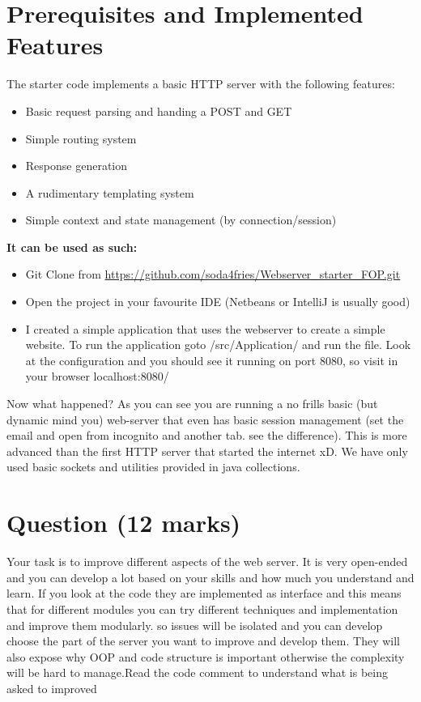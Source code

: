 \documentclass{article}
\begin{document}
\section{Prerequisites and Implemented Features}
The starter code implements a basic HTTP server with the following features:
\begin{itemize}
    \item Basic request parsing and handing a POST and GET
    \item Simple routing system
    \item Response generation
    \item A rudimentary templating system
    \item Simple context and state management (by connection/session)
\end{itemize}

\textbf{It can be used as such:}
\begin{itemize}
    \item Git Clone from \href{https://github.com/soda4fries/Webserver_starter_FOP.git}{https://github.com/soda4fries/Webserver\_starter\_FOP.git}
    \item Open the project in your favourite IDE (Netbeans or IntelliJ is usually good) 
    \item I created a simple application that uses the webserver to create a simple website. To run the application goto /src/Application/ and run the file. Look at the configuration and you should see it running on port 8080, so visit in your browser localhost:8080/
    
\end{itemize}

Now what happened? As you can see you are running a no frills basic (but dynamic mind you) web-server that even has basic session management (set the email and open from incognito and another tab. see the difference). This is more advanced than the first HTTP server that started the internet xD. We have only used basic sockets and utilities provided in java collections. 

\section{Question (12 marks)}
Your task is to improve different aspects of the web server. It is very open-ended and you can develop a lot based on your skills and how much you understand and learn. If you look at the code they are implemented as interface and this means that for different modules you can try different techniques and implementation and improve them modularly. so issues will be isolated and you can develop choose the part of the server you want to improve and develop them. They will also expose why OOP and code structure is important otherwise the complexity will be hard to manage.Read the code comment to understand what is being asked to improved
\end{document}
